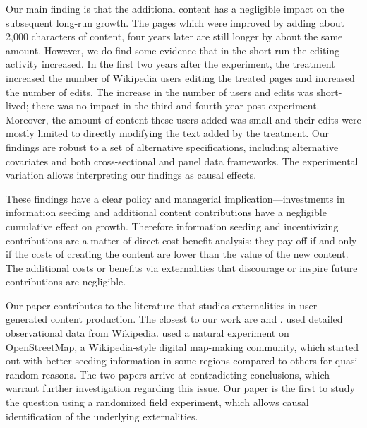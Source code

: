 \documentclass[12pt]{article}
\begin{document}
Our main finding is that the additional content has a negligible impact on the subsequent long-run growth. The pages which were improved by adding about 2,000 characters of content, four years later are still longer by about the same amount. 
However, we do find some evidence that in the short-run the editing activity increased. In the first two years after the experiment, the treatment increased the number of Wikipedia users editing the treated pages and increased the number of edits. The increase in the number of users and edits was short-lived; there was no impact in the third and fourth year post-experiment. Moreover, the amount of content these users added was small and their edits were mostly limited to directly modifying the text added by the treatment. Our findings are robust to a set of alternative specifications, including alternative covariates and both cross-sectional and panel data frameworks. The experimental variation allows interpreting our findings as causal effects. 

These findings have a clear policy and managerial implication---investments in information seeding and additional content contributions have a negligible cumulative effect on growth. Therefore information seeding and incentivizing contributions are a matter of direct cost-benefit analysis: they pay off if and only if the costs of creating the content are lower than the value of the new content. The additional costs or benefits via externalities that discourage or inspire future contributions are negligible.

Our paper contributes to the literature that studies externalities in user-generated content production. The closest to our work are \cite{aaltonen-seiler-2016} and \cite{nagaraj2017information}. \cite{aaltonen-seiler-2016} used detailed observational data from Wikipedia.  \cite{nagaraj2017information} used a natural experiment on OpenStreetMap, a Wikipedia-style digital map-making community, which started out with better seeding information in some regions compared to others for quasi-random reasons. The two papers arrive at contradicting conclusions, which warrant further investigation regarding this issue. Our paper is the first to study the question using a randomized field experiment, which allows causal identification of the underlying externalities. 
\end{document}
